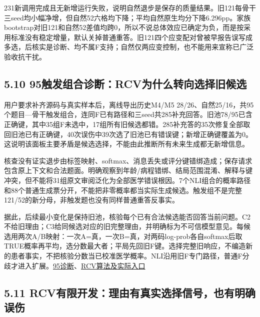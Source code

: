 \documentclass[
  11pt,
  a4paper,
]{article}
\begin{document}
231新调用完成且无新增运行失败，说明自然退步是保存的质量结果。旧121每骨干三seed均小幅净增，但自然52六格均下降；平均自然原生均分下降6.296pp。家族bootstrap对旧121和自然52差值均跨0，所以不说总体效应已确定为负，而是按采用标准没有稳定增量，默认关掉普通重答。旧121四个应变配对曾被早报告误写成多选，后核实是诊断、均不属F支持；自然仅两应变控制，也不能用来宣称已广泛验收抗干扰。

\subsection{5.10
95触发组合诊断：RCV为什么转向选择旧候选}\label{ux89e6ux53d1ux7ec4ux5408ux8bcaux65adrcvux4e3aux4ec0ux4e48ux8f6cux5411ux9009ux62e9ux65e7ux5019ux9009}

用户要求补齐源码与真实样本后，离线导出历史M4/M5
28/26、自然25/16，共95个题目---骨干触发组合，连同F已有路径和三seed共285补充回答。旧池78/95已含正确键，其中35组F未选中，17组所有旧候选都错。285补充答的35次修复全部取回旧池已有正确键，40次误伤中39次选了旧池已有错误键；新增正确键覆盖为0。这说明该面板主要矛盾是候选选择，不能由此推断所有未来生成都无新增信息。

核查没有证实退步由标签映射、softmax、消息丢失或评分键错绑造成；保存请求包含原上下文和合法题面。明确观察到年龄/病程错绑、结局范围混淆、解释与键冲突，但不能将31组原文审阅泛化为全部医学错误根因。7个NLI组合的概率路径和88个普通生成票分开，不能把非零概率都当实际生成候选。触发组不是完整121/52的新分母，非触发题也没有同样普通重答反事实。

据此，后续最小变化是保持旧池，核验每个已有合法候选能否回答当前问题。C2不给旧理由；C3给同候选对应的旧完整理由，并明确标为不可信模型意见。每候选用两次A/B映射：一次A=真，一次B=真，对两码log-prob各自softmax后取TRUE概率再平均，选分数最大者；平局先回旧F键。选择完整旧响应，不编造新的患者事实，不把核验分数当已校准医学概率。NLI沿用旧F专门路径，普通F分歧才进入扩展。\href{https://github.com/xiotakut/cf_mrg/blob/main/papers/2026-10-02_cf_moa/author_dossier/records/research/cf_moa.md\#L2171}{95诊断}、\href{https://github.com/xiotakut/cf_mrg/blob/main/papers/2026-10-02_cf_moa/author_dossier/records/research/cf_moa_experiment_report.md\#L1584}{RCV算法及实际入口}

\subsection{5.11
RCV有限开发：理由有真实选择信号，也有明确误伤}\label{rcvux6709ux9650ux5f00ux53d1ux7406ux7531ux6709ux771fux5b9eux9009ux62e9ux4fe1ux53f7ux4e5fux6709ux660eux786eux8befux4f24}
\end{document}
